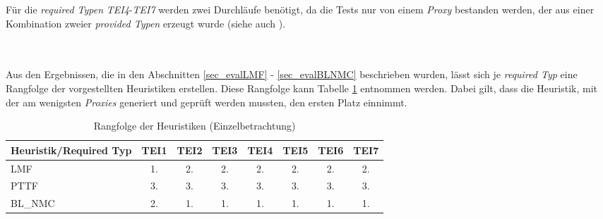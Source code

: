 \begin{multicols}{2}
\columnbreak
{}
\end{multicols}
\begin{multicols}{2}
\columnbreak
{}
\end{multicols}
\begin{multicols}{2}
\columnbreak
{}
\end{multicols}
\noindent
Für die \emph{required Typen} \emph{TEI4}-\emph{TEI7} werden zwei Durchläufe benötigt, da die Tests nur von einem \emph{Proxy} bestanden werden, der aus einer Kombination zweier \emph{provided Typen} erzeugt wurde (siehe auch ).




\noindent
\\\\
Aus den Ergebnissen, die in den Abschnitten \ref{sec_evalLMF} - \ref{sec_evalBLNMC} beschrieben wurden, lässt sich je \emph{required Typ} eine Rangfolge der vorgestellten \Gls{Heuristik}en erstellen. Diese Rangfolge kann Tabelle \ref{tab_rankingSingle} entnommen werden. Dabei gilt, dass die \Gls{Heuristik}, mit der am wenigsten \emph{Proxies} generiert und geprüft werden mussten, den ersten Platz einnimmt. 
\begin{table}[!h]
\centering
\begin{tabular}{|l|c|c|c|c|c|c|c|}
\hline
\hline
\textbf{Heuristik/Required Typ} & \textbf{TEI1} & \textbf{TEI2}& \textbf{TEI3}& \textbf{TEI4}& \textbf{TEI5}& \textbf{TEI6}& \textbf{TEI7}\\
\hline
\hline
LMF  &1.&2.&2.&2.&2.&2.&2.\\
\hline
PTTF  &3. &3.&3.&3.&3.&3.&3. \\
\hline
BL\_NMC & 2. &1. &1. &1. &1.&1.&1.\\
\hline
\hline
\end{tabular}
\caption{Rangfolge der Heuristiken (Einzelbetrachtung)}
\label{tab_rankingSingle}
\end{table}


